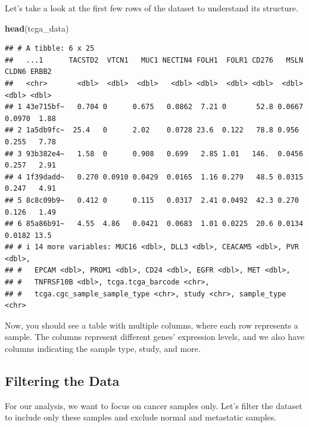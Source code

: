 \documentclass[
]{book}
\newenvironment{Shaded}{\begin{snugshade}}{\end{snugshade}}
\newcommand{\FunctionTok}[1]{\textcolor[rgb]{0.13,0.29,0.53}{\textbf{#1}}}
\newcommand{\NormalTok}[1]{#1}
\newcommand{\SpecialCharTok}[1]{\textcolor[rgb]{0.81,0.36,0.00}{\textbf{#1}}}
\begin{document}
Let's take a look at the first few rows of the dataset to understand its structure.

\begin{Shaded}
\begin{Highlighting}[]
\FunctionTok{head}\NormalTok{(tcga\_data)}
\end{Highlighting}
\end{Shaded}

\begin{verbatim}
## # A tibble: 6 x 25
##   ...1      TACSTD2  VTCN1   MUC1 NECTIN4 FOLH1  FOLR1 CD276   MSLN  CLDN6 ERBB2
##   <chr>       <dbl>  <dbl>  <dbl>   <dbl> <dbl>  <dbl> <dbl>  <dbl>  <dbl> <dbl>
## 1 43e715bf~   0.704 0      0.675   0.0862  7.21 0       52.8 0.0667 0.0970  1.88
## 2 1a5db9fc~  25.4   0      2.02    0.0728 23.6  0.122   78.8 0.956  0.255   7.78
## 3 93b382e4~   1.58  0      0.908   0.699   2.85 1.01   146.  0.0456 0.257   2.91
## 4 1f39dadd~   0.270 0.0910 0.0429  0.0165  1.16 0.279   48.5 0.0315 0.247   4.91
## 5 8c8c09b9~   0.412 0      0.115   0.0317  2.41 0.0492  42.3 0.270  0.126   1.49
## 6 85a86b91~   4.55  4.86   0.0421  0.0683  1.01 0.0225  20.6 0.0134 0.0182 13.5 
## # i 14 more variables: MUC16 <dbl>, DLL3 <dbl>, CEACAM5 <dbl>, PVR <dbl>,
## #   EPCAM <dbl>, PROM1 <dbl>, CD24 <dbl>, EGFR <dbl>, MET <dbl>,
## #   TNFRSF10B <dbl>, tcga.tcga_barcode <chr>,
## #   tcga.cgc_sample_sample_type <chr>, study <chr>, sample_type <chr>
\end{verbatim}

Now, you should see a table with multiple columns, where each row represents a sample. The columns represent different genes' expression levels, and we also have columns indicating the sample type, study, and more.

\hypertarget{filtering-the-data}{%
\subsection{Filtering the Data}\label{filtering-the-data}}

For our analysis, we want to focus on cancer samples only. Let's filter the dataset to include only these samples and exclude normal and metastatic samples.

\begin{Shaded}
\end{Shaded}
\end{document}
